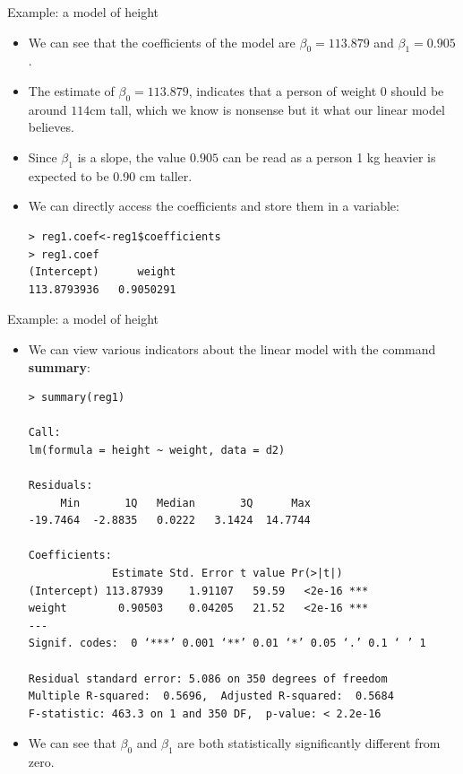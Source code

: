 \documentclass[handout]{beamer}
\begin{document}
\begin{frame}[fragile]{Example: a model of height}
\scriptsize{

 \begin{itemize}
 
  \item We can see that the coefficients of the model are $\beta_{0}=113.879$ and $\beta_{1}=0.905$. 


\item The estimate of $\beta_{0}=113.879$, indicates that a person of weight 0 should be around $114$cm tall, which we know is nonsense but it what our linear model believes.  
 
 \item Since $\beta_1$ is a slope, the value $0.905$ can be read as a person 1 kg heavier is expected to be 0.90 cm taller.
 
 
 \item We can directly access the coefficients and store them in a variable:
 \begin{verbatim}
> reg1.coef<-reg1$coefficients
> reg1.coef
(Intercept)      weight 
113.8793936   0.9050291 
 \end{verbatim}

 
 \end{itemize}
 
 


} 
\end{frame}


\begin{frame}[fragile]{Example: a model of height}
\scriptsize{


\begin{itemize}


\item We can view various indicators about the linear model with the command \textbf{summary}:
 
\begin{verbatim}
> summary(reg1)

Call:
lm(formula = height ~ weight, data = d2)

Residuals:
     Min       1Q   Median       3Q      Max 
-19.7464  -2.8835   0.0222   3.1424  14.7744 

Coefficients:
             Estimate Std. Error t value Pr(>|t|)    
(Intercept) 113.87939    1.91107   59.59   <2e-16 ***
weight        0.90503    0.04205   21.52   <2e-16 ***
---
Signif. codes:  0 ‘***’ 0.001 ‘**’ 0.01 ‘*’ 0.05 ‘.’ 0.1 ‘ ’ 1

Residual standard error: 5.086 on 350 degrees of freedom
Multiple R-squared:  0.5696,  Adjusted R-squared:  0.5684 
F-statistic: 463.3 on 1 and 350 DF,  p-value: < 2.2e-16

\end{verbatim}
\item We can see that $\beta_0$ and $\beta_1$ are both statistically significantly different from zero.  
 
 \end{itemize}
 
 


} 
\end{frame}
\end{document}
